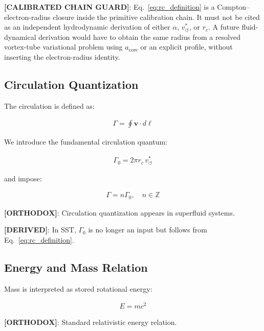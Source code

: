 \documentclass[11pt]{article}
\theoremstyle{definition}
\theoremstyle{plain}
\theoremstyle{remark}
\newcommand{\rc}{{r_c}}
\newcommand{\vchar}{v_{\!\boldsymbol{\circlearrowleft}}^{\ast}}
\begin{document}
        \textbf{[CALIBRATED CHAIN GUARD]}: Eq.~\eqref{eq:rc_definition} is a Compton--electron-radius closure inside the primitive calibration chain. It must not be cited as an independent hydrodynamic derivation of either $\alpha$, $\vchar$, or $\rc$. A future fluid-dynamical derivation would have to obtain the same radius from a resolved vortex-tube variational problem using $a_{\mathrm{core}}$ or an explicit profile, without inserting the electron-radius identity.
    
    \subsection{Circulation Quantization}
        
        The circulation is defined as:
        
        \begin{align}
            \Gamma = \oint \mathbf{v} \cdot d\ell
        \end{align}
        
        We introduce the fundamental circulation quantum:
        
        \begin{align}
            \Gamma_0 = 2\pi \rc \, \vchar
            \label{eq:gamma0}
        \end{align}
        
        and impose:
        
        \begin{align}
            \Gamma = n \Gamma_0, \quad n \in \mathbb{Z}
        \end{align}
        
        \textbf{[ORTHODOX]}: Circulation quantization appears in superfluid systems.
        
        \textbf{[DERIVED]}: In SST, $\Gamma_0$ is no longer an input but follows from Eq.~\ref{eq:rc_definition}.
    
    \subsection{Energy and Mass Relation}
        
        Mass is interpreted as stored rotational energy:
        
        \begin{align}
            E = m c^2
        \end{align}
        
        \textbf{[ORTHODOX]}: Standard relativistic energy relation.
        
\end{document}
